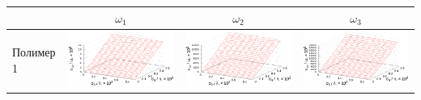 \documentclass[12pt,a4paper]{article}
\begin{document}
\begin{table}[h]
  \centering
  \footnotesize
  \begin{tabular}{l | c c c}
	  & $\omega_1$ & $\omega_2$ & $\omega_3$ \\ \hline
	\begin{rotate}{90}Полимер 1\end{rotate} &	\includegraphics[scale=0.4]{figs/all/p1.txt_coeff0.dat.eps} & \includegraphics[scale=0.4]{figs/all/p1.txt_coeff1.dat.eps} & \includegraphics[scale=0.4]{figs/all/p1.txt_coeff2.dat.eps} \\

\end{tabular}
\end{table}
\end{document}
